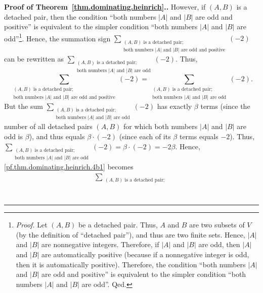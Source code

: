\documentclass[numbers=enddot,12pt,final,onecolumn,notitlepage]{scrartcl}%
\theoremstyle{definition}
\newenvironment{proof}[1][Proof]{\noindent\textbf{#1.} }{\ \rule{0.5em}{0.5em}}
\let\sumnonlimits\sum
\renewcommand{\sum}{\sumnonlimits\limits}
\newcommand{\abs}[1]{\left| #1 \right|}
\newcommand{\tup}[1]{\left( #1 \right)}
\begin{document}
\begin{proof}[Proof of Theorem~\ref{thm.dominating.heinrich}.]
However, if $\tup{A, B}$ is a detached pair, then the condition
``both numbers $\abs{A}$ and $\abs{B}$ are odd and positive'' is
equivalent to the simpler condition
``both numbers $\abs{A}$ and $\abs{B}$ are
odd''\footnote{\textit{Proof.} Let $\tup{A, B}$ be a detached pair.
Thus, $A$ and $B$ are two subsets of $V$ (by the definition of
``detached pair''), and thus are two finite sets. Hence, $\abs{A}$ and
$\abs{B}$ are nonnegative integers. Therefore, if $\abs{A}$ and
$\abs{B}$ are odd, then $\abs{A}$ and $\abs{B}$ are automatically
positive (because if a nonnegative integer is odd, then it is
automatically positive). Therefore, the condition
``both numbers $\abs{A}$ and $\abs{B}$ are odd and positive'' is
equivalent to the simpler condition
``both numbers $\abs{A}$ and $\abs{B}$ are odd''. Qed.}. Hence, the
summation sign
$\sum_{\substack{\tup{A, B} \text{ is a detached pair}; \\
                \text{both numbers } \abs{A} \text{ and } \abs{B}
                \text{ are odd and positive}}} \tup{-2}$
can be rewritten as
$\sum_{\substack{\tup{A, B} \text{ is a detached pair}; \\
                \text{both numbers } \abs{A} \text{ and } \abs{B}
                \text{ are odd}}} \tup{-2}$.
Thus,
\[
\sum_{\substack{\tup{A, B} \text{ is a detached pair}; \\
                \text{both numbers } \abs{A} \text{ and } \abs{B}
                \text{ are odd and positive}}} \tup{-2}
= \sum_{\substack{\tup{A, B} \text{ is a detached pair}; \\
                \text{both numbers } \abs{A} \text{ and } \abs{B}
                \text{ are odd}}} \tup{-2} .
\]
But the sum $\sum_{\substack{\tup{A, B} \text{ is a detached pair}; \\
                \text{both numbers } \abs{A} \text{ and } \abs{B}
                \text{ are odd}}} \tup{-2}$
has exactly $\beta$ terms (since the number of all detached pairs
$\tup{A, B}$ for which both numbers $\abs{A}$ and $\abs{B}$ are odd
is $\beta$), and thus equals $\beta \cdot \tup{-2}$ (since
each of its $\beta$ terms equals $-2$). Thus, \newline
$\sum_{\substack{\tup{A, B} \text{ is a detached pair}; \\
                \text{both numbers } \abs{A} \text{ and } \abs{B}
                \text{ are odd}}} \tup{-2}
= \beta \cdot \tup{-2} = -2 \beta$. Hence,
\eqref{pf.thm.dominating.heinrich.4b1} becomes
\begin{align}
\sum_{\substack{\tup{A, B} \text{ is a detached pair}; \\
}}
\end{align}
\end{proof}
\end{document}
